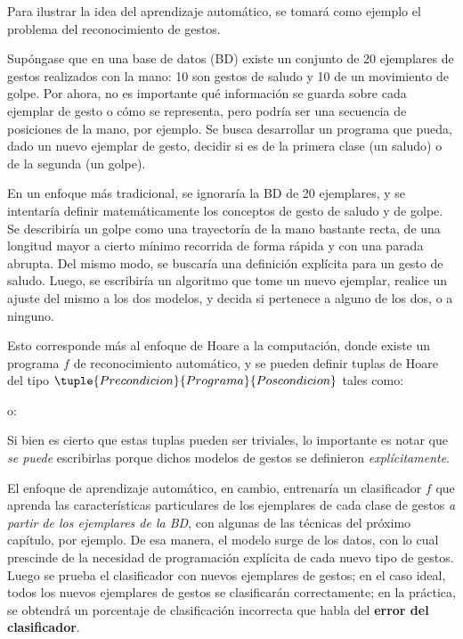 
Para ilustrar la idea del aprendizaje automático, se tomará como ejemplo el problema del reconocimiento de gestos. 

Supóngase que en una base de datos (BD) existe un conjunto de 20 ejemplares de gestos realizados con la mano: 10 son gestos de saludo y 10 de un movimiento de golpe. Por ahora, no es importante qué información se guarda sobre cada ejemplar de gesto o cómo se representa, pero podría ser una secuencia de posiciones de la mano, por ejemplo. Se busca desarrollar un programa que pueda, dado un nuevo ejemplar de gesto, decidir si es de la primera clase (un saludo) o de la segunda (un golpe). 



En un enfoque más tradicional, se ignoraría la BD de 20 ejemplares, y se intentaría definir matemáticamente los conceptos de gesto de saludo y de golpe. Se describiría un golpe como una trayectoría de la mano bastante recta, de una longitud mayor a cierto mínimo recorrida de forma rápida y con una parada abrupta. Del mismo modo, se buscaría una definición explícita para un gesto de saludo. Luego, se escribiría un algoritmo que tome un nuevo ejemplar, realice un ajuste del mismo a los dos modelos, y decida si pertenece a alguno de los dos, o a ninguno. 

Esto corresponde más al enfoque de Hoare a la computación, donde existe un programa $f$ de reconocimiento automático, y se pueden definir tuplas de Hoare del tipo $\tuple{Precondicion}{Programa}{Poscondicion}$ tales como: 

o: 

Si bien es cierto que estas tuplas pueden ser triviales, lo importante es notar que \textit{se puede} escribirlas porque dichos modelos de gestos se definieron \textit{explícitamente}. 

El enfoque de aprendizaje automático, en cambio, entrenaría un clasificador $f$ que aprenda las características particulares de los ejemplares de cada clase de gestos \textit{a partir de los ejemplares de la BD}, con algunas de las técnicas del próximo capítulo, por ejemplo. De esa manera, el modelo surge de  los datos, con lo cual prescinde de la necesidad de programación explícita de cada nuevo tipo de gestos. Luego se prueba el clasificador con nuevos ejemplares de gestos; en el caso ideal, todos los nuevos ejemplares de gestos se clasificarán correctamente; en la práctica, se obtendrá un porcentaje de clasificación incorrecta que habla del \textbf{error del clasificador}.

